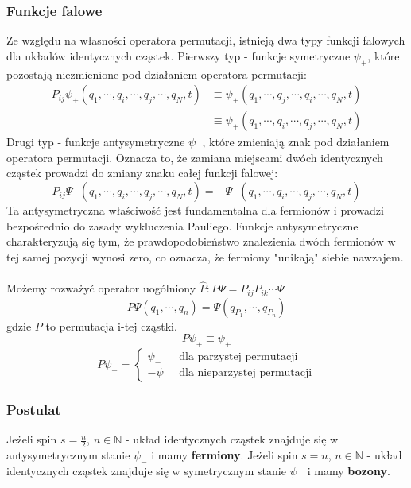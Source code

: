 \subsubsection{Funkcje falowe}
%
Ze względu na własności operatora permutacji, istnieją dwa typy funkcji falowych dla układów identycznych cząstek.
Pierwszy typ - funkcje symetryczne $\psi_+$, które pozostają niezmienione pod działaniem operatora permutacji:
%
\begin{equation*}
    \begin{aligned}
        P_{ij} \psi_+ (q_1, \cdots, q_i, \cdots, q_j, \cdots, q_N, t) &\equiv \psi_+ (q_1, \cdots, q_j, \cdots, q_i, \cdots, q_N, t) \\
        &\equiv \psi_+ (q_1, \cdots, q_i, \cdots, q_j, \cdots, q_N, t)
    \end{aligned}
\end{equation*}
%
Drugi typ - funkcje antysymetryczne $\psi_-$, które zmieniają znak pod działaniem operatora permutacji.
Oznacza to, że zamiana miejscami dwóch identycznych cząstek prowadzi do zmiany znaku całej funkcji falowej:
%
\begin{equation*}
    P_{ij} \Psi_- (q_1, \cdots, q_i, \cdots, q_j, \cdots, q_N, t) = - \Psi_- (q_1, \cdots, q_i, \cdots, q_j, \cdots, q_N, t)
\end{equation*}
Ta antysymetryczna właściwość jest fundamentalna dla fermionów i prowadzi bezpośrednio do zasady wykluczenia Pauliego.
Funkcje antysymetryczne charakteryzują się tym, że prawdopodobieństwo znalezienia dwóch fermionów w tej samej pozycji wynosi zero,
co oznacza, że fermiony "unikają" siebie nawzajem.
%
\\ \\
%
Możemy rozważyć operator uogólniony $\hat{P}: P \Psi = P_{ij}P_{ik} \cdots \Psi$
%
\begin{equation*}
    P \Psi  (q_1, \cdots, q_n) = \Psi(q_{P_1}, \cdots, q_{P_n})
\end{equation*}
%
gdzie $P$ to permutacja i-tej cząstki.
%
\begin{equation*}
    P \psi_+ \equiv \psi_+
\end{equation*}
%
\begin{equation*}
    P \psi_- =
    \begin{cases}
        \psi_- & \text{dla parzystej permutacji} \\
        - \psi_- & \text{dla nieparzystej permutacji}
    \end{cases}
\end{equation*}
%
\subsubsection{Postulat}
%
Jeżeli spin $s = \frac{n}{2}$, $n \in \mathbb{N}$ - układ identycznych cząstek znajduje się w antysymetrycznym stanie $\psi_-$ i mamy \textbf{fermiony}.
Jeżeli spin $s = n$, $n \in \mathbb{N}$ - układ identycznych cząstek znajduje się w symetrycznym stanie $\psi_+$ i mamy \textbf{bozony}.
%
